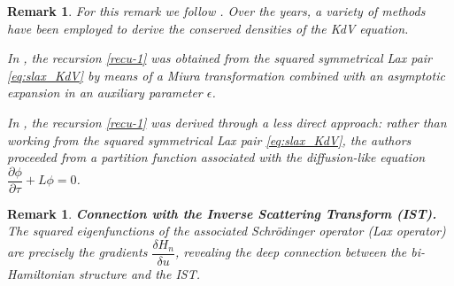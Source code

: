 \documentclass[a4paper,12pt]{article}
\newtheorem{rem}[thm]{Remark}
\begin{document}


  \begin{rem} For this remark we follow \cite{mckean1975spectrum,MCL}.
Over the years, a variety of methods have been employed to derive the conserved densities of the KdV equation.

In \cite{GGKM}, the recursion \eqref{recu-1} was obtained from the squared symmetrical Lax pair \eqref{eq:slax_KdV} by means of a Miura transformation combined with an asymptotic expansion in an auxiliary parameter $\epsilon$.

In \cite{mckean1975spectrum}, the recursion \eqref{recu-1} was derived through a less direct approach: rather than working from the squared symmetrical Lax pair \eqref{eq:slax_KdV}, the authors proceeded from a partition function associated with the diffusion-like equation $\dfrac{\partial \phi}{\partial \tau} + L\phi = 0$.
\end{rem}

\begin{rem}
    \textbf{Connection with the Inverse Scattering Transform (IST).}
        The squared eigenfunctions of the associated Schr\"{o}dinger operator (Lax
        operator) are precisely the gradients $\dfrac{\delta H_n}{\delta u}$,
        revealing the deep connection between the bi-Hamiltonian structure and the IST.
\end{rem}
\end{document}

